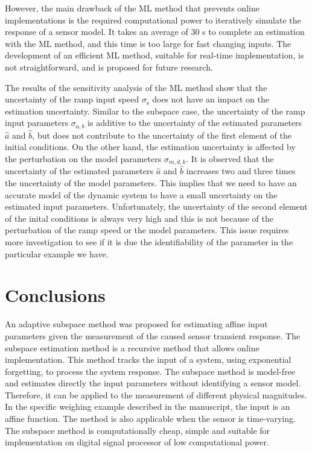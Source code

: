 However, the main drawback of the ML method that prevents online implementations is the required computational power to iteratively simulate the response of a sensor model.
It takes an average of 30 s to complete an estimation with the ML method, and this time is too large for fast changing inputs.
The development of an efficient ML method, suitable for real-time implementation, is not straightforward, and is proposed for future research.

The results of the sensitivity analysis of the ML method show that the uncertainty of the ramp input speed $\sigma_{\mathrm{s}}$ does not have an impact on the estimation uncertainty.
Similar to the subspace case, the uncertainty of the ramp input parameters $\sigma_{a,b}$ is additive to the uncertainty of the estimated parameters $\widehat{a}$ and $\widehat{b}$, but does not contribute to the uncertainty of the first element of the initial conditions.
On the other hand, the estimation uncertainty is affected by the perturbation on the model parameters $\sigma_{m,d,k}$.
It is observed that the uncertainty of the estimated parameters $\widehat{a}$ and $\widehat{b}$ increases two and three times the uncertainty of the model parameters.
This implies that we need to have an accurate model of the dynamic system to have a small uncertainty on the estimated input parameters.
Unfortunately, the uncertainty of the second element of the inital conditions is always very high and this is not because of the perturbation of the ramp speed or the model parameters. 
This issue requires more investigation to see if it is due the identifiability of the parameter in the particular example we have.


\section{Conclusions}

An adaptive subspace method was proposed for estimating affine input parameters given the measurement of the caused sensor transient response. 
The subspace estimation method is a recursive method that allows online implementation.
This method tracks the input of a system, using exponential forgetting, to process the system response.
The subspace method is model-free and estimates directly the input parameters without identifying a sensor model.
Therefore, it can be applied to the measurement of different physical magnitudes.
In the specific weighing example described in the manuscript, the input is an affine function.
The method is also applicable when the sensor is time-varying.
The subspace method is computationally cheap, simple and suitable for implementation on digital signal processor of low computational power. 

